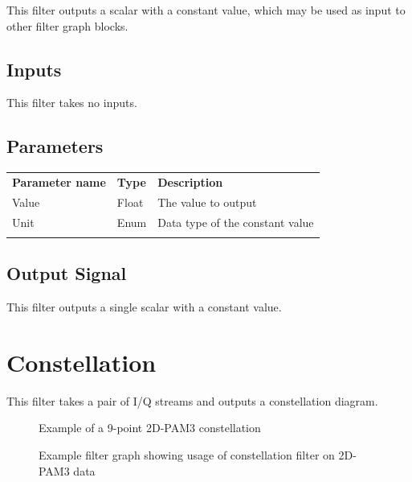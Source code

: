 This filter outputs a scalar with a constant value, which may be used as input to other filter graph blocks.

\subsection{Inputs}

This filter takes no inputs.

\subsection{Parameters}

\begin{tabularx}{16cm}{llX}
\thickhline
\textbf{Parameter name} & \textbf{Type} & \textbf{Description} \\
\thickhline
Value & Float & The value to output\\
\thinhline
Unit & Enum & Data type of the constant value\\
\thickhline
\end{tabularx}

\subsection{Output Signal}

This filter outputs a single scalar with a constant value.

\pagebreak
\section{Constellation}
\label{filter:constellation}

This filter takes a pair of I/Q streams and outputs a constellation diagram.

\begin{figure}[h]
\centering
{}
\caption{Example of a 9-point 2D-PAM3 constellation}
\label{filter_constellation}
\end{figure}

\begin{figure}[h]
\centering
{}
\caption{Example filter graph showing usage of constellation filter on 2D-PAM3 data}
\label{filter_graph_constellation}
\end{figure}

